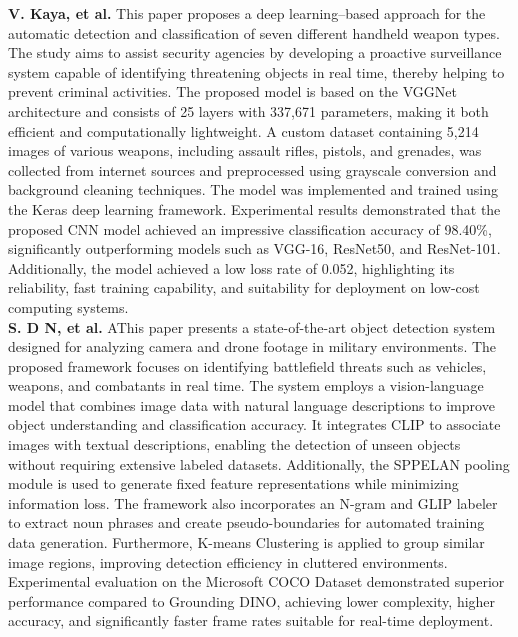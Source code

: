 \textbf{V. Kaya, et al.} This paper proposes a deep learning–based approach for the automatic detection and classification of seven different handheld weapon types. The study aims to assist security agencies by developing a proactive surveillance system capable of identifying threatening objects in real time, thereby helping to prevent criminal activities. The proposed model is based on the VGGNet architecture and consists of 25 layers with 337,671 parameters, making it both efficient and computationally lightweight. A custom dataset containing 5,214 images of various weapons, including assault rifles, pistols, and grenades, was collected from internet sources and preprocessed using grayscale conversion and background cleaning techniques. The model was implemented and trained using the Keras deep learning framework. Experimental results demonstrated that the proposed CNN model achieved an impressive classification accuracy of 98.40\%, significantly outperforming models such as VGG-16, ResNet50, and ResNet-101. Additionally, the model achieved a low loss rate of 0.052, highlighting its reliability, fast training capability, and suitability for deployment on low-cost computing systems. \cite{supplementary_paper_2} \\

\textbf{S. D N, et al.} AThis paper presents a state-of-the-art object detection system designed for analyzing camera and drone footage in military environments. The proposed framework focuses on identifying battlefield threats such as vehicles, weapons, and combatants in real time. The system employs a vision-language model that combines image data with natural language descriptions to improve object understanding and classification accuracy. It integrates CLIP to associate images with textual descriptions, enabling the detection of unseen objects without requiring extensive labeled datasets. Additionally, the SPPELAN pooling module is used to generate fixed feature representations while minimizing information loss. The framework also incorporates an N-gram and GLIP labeler to extract noun phrases and create pseudo-boundaries for automated training data generation. Furthermore, K-means Clustering is applied to group similar image regions, improving detection efficiency in cluttered environments. Experimental evaluation on the Microsoft COCO Dataset demonstrated superior performance compared to Grounding DINO, achieving lower complexity, higher accuracy, and significantly faster frame rates suitable for real-time deployment. \cite{supplementary_paper_3} \\

